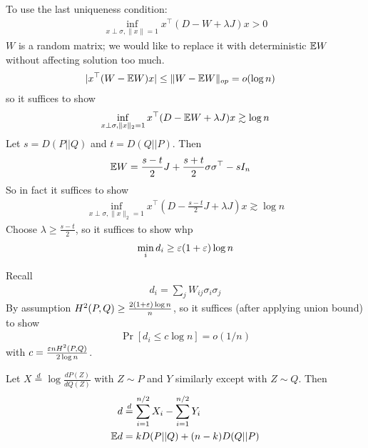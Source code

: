 To use the last uniqueness condition:
\begin{align}
  \inf_{x \perp \sigma, \|x\|=1} x^\top(D - W + \lambda J) x > 0
\end{align}
$W$ is a random matrix; we would like to replace it with
deterministic $\mathbb{E} W$ without affecting solution too much.
\begin{align}
  \lvert x^\top (W - \mathbb{E} W) x \rvert
  &\leq \|W - \mathbb{E} W\|_{op} 
  = o(\log n)
\end{align}
so it suffices to show
\begin{align}
  \inf_{x \perp \sigma, \|x\|_2 = 1} x^\top (D - \mathbb{E} W + \lambda J) x \gtrsim \log n
\end{align}
Let $s = D(P || Q)$ and $t = D(Q || P)$. Then
\begin{align}
  \mathbb{E} W &= \frac{s - t}{2} J + \frac{s + t}{2} \sigma \sigma^\top - s I_n
\end{align}
So in fact it suffices to show
\begin{align}
  \inf_{x \perp \sigma, \|x\|_2 = 1} x^\top (D - \frac{s-t}{2} J + \lambda J) x \gtrsim \log n
\end{align}
Choose $\lambda \geq \frac{s-t}{2}$, so it suffices to show
whp
\begin{align}
  \min_i d_i \geq \varepsilon (1 + \varepsilon) \log n
\end{align}

Recall
\begin{align}
  d_i = \sum_j W_{ij} \sigma_i \sigma_j
\end{align}
By assumption $H^2(P, Q) \geq \frac{2(1+\varepsilon) \log n}{n}$, so
it suffices (after applying union bound) to show
\begin{align}
  \Pr[d_i \leq c \log n] = o(1/n)
\end{align}
with $c = \frac{\varepsilon n H^2(P, Q)}{2 \log n}$.

Let $X \overset{d}{=} \log \frac{dP(Z)}{dQ(Z)}$ with $Z \sim P$
and $Y$ similarly except with $Z \sim Q$. Then
\begin{align}
  d &\overset{d}{=} \sum_{i=1}^{n/2} X_i - \sum_{i=1}^{n/2} Y_i \\
  \mathbb{E} d &= k D(P||Q) + (n-k) D(Q||P)
\end{align}

